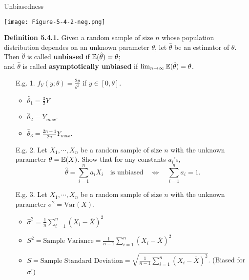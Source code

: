  \begin{frame}{Unbiasedness}
 \begin{center}
 \texttt{[image: Figure-5-4-2-neg.png]}
\end{center}
 \vfill
 {\bf Definition 5.4.1.} Given a random sample of size $n$ whose population distribution dependes on an unknown parameter $\theta$, let $\hat{\theta}$ be an estimator of $\theta$. \\[0.5em]
 Then $\hat{\theta}$ is called {\bf unbiased} if $\mathbb{E}(\hat{\theta}) = \theta$; \\[0.5em]
 and $\hat{\theta}$ is called {\bf asymptotically unbiased} if $\lim_{n\rightarrow\infty}\mathbb{E}(\hat{\theta}) = \theta$.
\end{frame}
\begin{frame}
\begin{enumerate}
\item[E.g. 1.] $f_Y(y;\theta)=\frac{2y}{\theta^2}$ if $y\in [0,\theta]$.
 \begin{itemize}
  \item $\displaystyle\hat{\theta}_1=\frac{3}{2}\overline{Y}$
  \item $\displaystyle\hat{\theta}_2=Y_{max}$.
  \item $\displaystyle\hat{\theta}_3=\frac{2n+1}{2n}Y_{max}$.
 \end{itemize}
 \vfill
 \item[E.g. 2.] Let $X_1,\cdots,X_n$ be a random sample of size $n$ with the unknown parameter $\theta=\mathbb{E}(X)$. Show that for any constants $a_i$'s,
 \[
 \hat{\theta}=\sum_{i=1}^n a_i X_i \quad \text{is unbiased}
 \quad \Longleftrightarrow\quad
 \sum_{i=1}^n a_i=1.
 \]
\end{enumerate}
\end{frame}
\begin{frame}
 \begin{enumerate}
 \item[E.g. 3.] Let $X_1,\cdots,X_n$ be a random sample of size $n$ with the unknown parameter $\sigma^2=\text{Var}(X)$.
 \begin{itemize}
  \item $\displaystyle \widehat{\sigma}^2=\frac{1}{n}\sum_{i=1}^n \left(X_i-\overline{X}\right)^2$
  \vfill
  \item $\displaystyle S^2= \text{Sample Variance} =\frac{1}{n-1}\sum_{i=1}^n \left(X_i-\overline{X}\right)^2$
  \vfill
  \item $\displaystyle S= \text{Sample Standard Deviation} =\sqrt{\frac{1}{n-1}\sum_{i=1}^n \left(X_i-\overline{X}\right)^2}$. \hfill (Biased for $\sigma$!)
 \end{itemize}
 \vfill
 \end{enumerate}
\end{frame}
